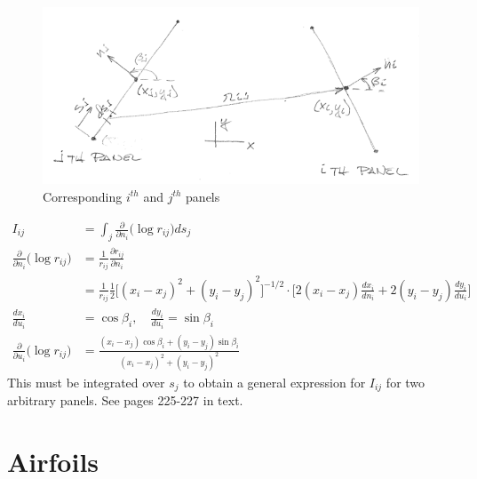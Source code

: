 \documentclass[draft=false, titlepage]{article}
\newcommand{\partialfrac}[2]{\frac{\partial #1}{\partial #2}}
\begin{document}
\begin{figure}[ht]
    \centering
    \includegraphics[width=0.8\linewidth]{Figures/sourcePanels2.PNG}
    \caption{Corresponding $i^{th}$ and $j^{th}$ panels}
    \label{fig:sourcePanels2}
\end{figure}
\begin{align*}
    I_{ij} &= \int_j \partialfrac{}{n_i} \big(\log r_{ij}\big) ds_j\\
    \partialfrac{}{n_i} \big(\log r_{ij}\big) &=
    \frac{1}{r_{ij}} \partialfrac{r_{ij}}{n_i}\\
    &=
    \frac{1}{r_{ij}}\frac{1}{2}\Big[ (x_i-x_j)^2 + (y_i-y_j)^2 \Big]^{-1/2} \cdot
    \Big[ 2(x_i-x_j)\frac{dx_i}{dn_i} + 2(y_i-y_j)\frac{dy_i}{du_i} \Big]\\
    \frac{dx_i}{du_i} &=
    \cos\beta_i,\quad \frac{dy_i}{du_i} = \sin\beta_i\\
    \partialfrac{}{u_i}\big( \log r_{ij} \big) &=
    \frac{ (x_i-x_j) \cos\beta_i + (y_i-y_j)\sin\beta_i }{ (x_i-x_j)^2 + (y_i-y_j)^2 }
\end{align*}
This must be integrated over $s_j$ to obtain a general expression for $I_{ij}$ for two arbitrary panels. See pages 225-227 in text.

\section{Airfoils}
\end{document}
